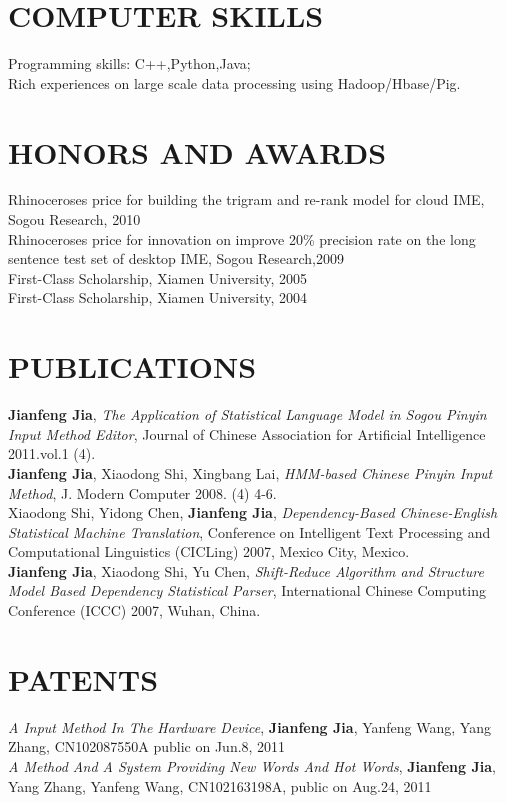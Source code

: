 \documentclass{res}
\begin{document}
\begin{resume}
\section{COMPUTER SKILLS}          
    Programming skills: C++,Python,Java;\\
    Rich experiences on large scale data processing using Hadoop/Hbase/Pig.
 
\section{HONORS AND AWARDS}             
     Rhinoceroses price for building the trigram and re-rank model for cloud IME, Sogou Research, 2010 \\
     Rhinoceroses price for innovation on improve 20\% precision rate on the long sentence test set of desktop IME, Sogou Research,2009 \\
     First-Class Scholarship, Xiamen University, 2005 \\
     First-Class Scholarship, Xiamen University, 2004 

\section{PUBLICATIONS}
     \textbf{Jianfeng Jia}, \emph{The Application of Statistical Language Model in Sogou Pinyin Input Method Editor}, Journal of Chinese Association for Artificial Intelligence 2011.vol.1 (4).\\
     \textbf{Jianfeng Jia}, Xiaodong Shi, Xingbang Lai, \emph{HMM-based Chinese Pinyin Input Method}, J. Modern Computer 2008. (4) 4-6.\\
     Xiaodong Shi, Yidong Chen, \textbf{Jianfeng Jia}, \emph{Dependency-Based Chinese-English Statistical Machine Translation}, Conference on Intelligent Text Processing and Computational Linguistics (CICLing) 2007, Mexico City, Mexico.\\
     \textbf{Jianfeng Jia}, Xiaodong Shi, Yu Chen, \emph{Shift-Reduce Algorithm and Structure Model Based Dependency Statistical Parser}, International Chinese Computing Conference (ICCC) 2007, Wuhan, China.

\section{PATENTS}
\emph{A Input Method In The Hardware Device}, \textbf{Jianfeng Jia}, Yanfeng Wang, Yang Zhang, CN102087550A public on Jun.8, 2011\\
\emph{A Method And A System Providing New Words And Hot Words}, \textbf{Jianfeng Jia}, Yang Zhang, Yanfeng Wang, CN102163198A, public on Aug.24, 2011 \\


\end{resume}
\end{document}
